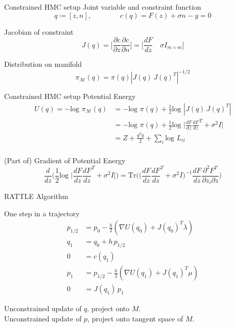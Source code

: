 \documentclass[10pt]{beamer}
\newcommand{\p}[2]{\frac{\partial #1 }{\partial #2 }}
\begin{document}
\begin{frame}[fragile]{Constrained HMC setup}
    Joint variable and constraint function
    $$q \coloneqq [z, n], \qquad \qquad c(q) = F(z) + \sigma n - y = 0$$
    
    Jacobian of constraint
    $$J(q) = \Big[ \p{c}{z} \p{c}{n} \Big] = \Big[ \frac{dF}{dz} \quad \sigma I_{m \times m} \Big] $$
    
    Distribution on manifold
    $$\pi_\mathcal{M}(q) = \pi(q) |J(q) \, J(q) ^T|^{-1/2}$$
\end{frame}

\begin{frame}[fragile]{Constrained HMC setup}
    Potential Energy
    \begin{align*}
    U(q) = -\text{log }\pi_\mathcal{M}(q) &= -\text{log }\pi(q) + \frac{1}{2}\text{log } |J(q) \, J(q)^T| \\
    &= -\text{log }\pi(q) + \frac{1}{2} \text{log }\Bigg| \frac{dF}{dz} \frac{dF}{dz}^T  + \sigma^2 I\Bigg| \\
    &= Z + \frac{q^T q}{2} + \sum_i \text{log } L_{ii}\\
    \end{align*}
    
    (Part of) Gradient of Potential Energy
    $$\frac{d}{dz} \Big( \frac{1}{2} \text{log }\Big| \frac{dF}{dz} \frac{dF}{dz}^T  + \sigma^2 I\Big| \Big) = \text{Tr} \Bigg(  \Big( \frac{dF}{dz} \frac{dF}{dz}^T + \sigma^2 I\Big)^{-1}\frac{dF}{dz} \frac{\partial^2 F^T}{\partial z_i \partial z} \Bigg)$$

\end{frame}

\begin{frame}[fragile]{RATTLE Algorithm}

One step in a trajectory
\begin{align*}
    p_{1/2} &= p_0 - \frac{h}{2}(\nabla U(q_0) + J(q_0)^T \lambda)\\
    q_1 &= q_0 + h \, p_{1/2}\\
    0 &= c(q_1)\\
    p_1 &= p_{1/2} - \frac{h}{2}(\nabla U(q_1) + J(q_1)^T \mu)\\
    0 &= J(q_1) \, p_1
\end{align*}

Unconstrained update of $q$, project onto $M$.\\
Unconstrained update of $p$, project onto tangent space of $M$.

\end{frame}
\end{document}
